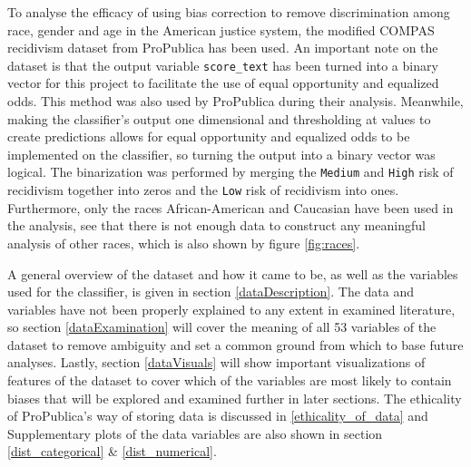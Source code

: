 \documentclass[11pt, fleqn, titlepage]{article}
\begin{document}
	\noindent To analyse the efficacy of using bias correction to remove discrimination among race, gender and age in the American justice system, the modified COMPAS recidivism dataset from ProPublica has been used. An important note on the dataset is that the output variable \texttt{score\_text} has been turned into a binary vector for this project to facilitate the use of equal opportunity and equalized odds. This method was also used by ProPublica during their analysis. Meanwhile, making the classifier's output one dimensional and thresholding at values to create predictions allows for equal opportunity and equalized odds to be implemented on the classifier, so turning the output into a binary vector was logical. The binarization was performed by merging the \texttt{Medium} and \texttt{High} risk of recidivism together into zeros and the \texttt{Low} risk of recidivism into ones. Furthermore, only the races African-American and Caucasian have been used in the analysis, see that there is not enough data to construct any meaningful analysis of other races, which is also shown by figure \ref{fig:races}.
	
	A general overview of the dataset and how it came to be, as well as the variables used for the classifier, is given in section \ref{dataDescription}. The data and variables have not been properly explained to any extent in examined literature, so section \ref{dataExamination} will cover the meaning of all 53 variables of the dataset to remove ambiguity and set a common ground from which to base future analyses. Lastly, section \ref{dataVisuals} will show important visualizations of features of the dataset to cover which of the variables are most likely to contain biases that will be explored and examined further in later sections. The ethicality of ProPublica's way of storing data is discussed in \ref{ethicality_of_data} and Supplementary plots of the data variables are also shown in section \ref{dist_categorical} \& \ref{dist_numerical}.
	
\end{document}
